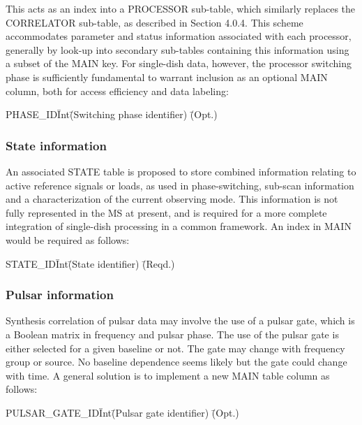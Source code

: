 \documentclass{article}
\begin{document}
This acts as an index into a PROCESSOR sub-table, which similarly
replaces the CORRELATOR sub-table, as described in Section 4.0.4.
This scheme accommodates parameter and status information associated
with each processor, generally by look-up into secondary sub-tables
containing this information using a subset of the MAIN key. For
single-dish data, however, the processor switching phase is
sufficiently fundamental to warrant inclusion as an optional MAIN
column, both for access efficiency and data labeling:

\begin{tabbing}
PHASE\_ID\quad\quad \= Int\quad\quad \= (Switching phase identifier)
 \quad\quad \= (Opt.) \\
\end{tabbing} 

\subsubsection{State information}

An associated STATE table is proposed to store combined information
relating to active reference signals or loads, as used in phase-switching, sub-scan information and a characterization of the current observing mode. This information is not fully represented in the MS at present, and is required for a more complete integration of single-dish processing in a common framework. An index in MAIN would be required as follows:

\begin{tabbing}
STATE\_ID\quad\quad \= Int\quad\quad \= (State identifier)
 \quad\quad \= (Reqd.) \\
\end{tabbing} 


\subsubsection{Pulsar information}

Synthesis correlation of pulsar data may involve the use of a pulsar gate,
which is a Boolean matrix in frequency and pulsar phase. The use of the
pulsar gate is either selected for a given baseline or not. The gate
may change with frequency group or source. No baseline dependence
seems likely but the gate could change with time. A general solution
is to implement a new MAIN table column as follows:

\begin{tabbing}
PULSAR\_GATE\_ID\quad\quad \= Int\quad\quad \= (Pulsar gate identifier)
 \quad\quad \= (Opt.) \\
\end{tabbing}
\end{document}
